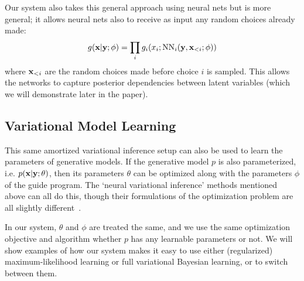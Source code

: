 Our system also takes this general approach using neural nets but is more general; it allows neural nets also to receive as input any random choices already made:
\begin{equation*}
g(\mathbf{x} | \mathbf{y} ; \phi) = \prod_i g_i(x_i ; \text{NN}_i(\mathbf{y}, \mathbf{x}_{<i} ; \phi))
\end{equation*}
where $\mathbf{x}_{<i}$ are the random choices made before choice $i$ is sampled. This allows the networks to capture posterior dependencies between latent variables (which we will demonstrate later in the paper).

\subsection{Variational Model Learning}

This same amortized variational inference setup can also be used to learn the parameters of generative models. If the generative model $p$ is also parameterized, i.e. $p(\mathbf{x} | \mathbf{y} ; \theta)$, then its parameters $\theta$ can be optimized along with the parameters $\phi$ of the guide program.
The `neural variational inference' methods mentioned above can all do this, though their formulations of the optimization problem are all slightly different~\cite{NVIL,DLGM,AEVB}.

In our system, $\theta$ and $\phi$ are treated the same, and we use the same optimization objective and algorithm whether $p$ has any learnable parameters or not.
We will show examples of how our system makes it easy to use either (regularized) maximum-likelihood learning or full variational Bayesian learning, or to switch between them.

